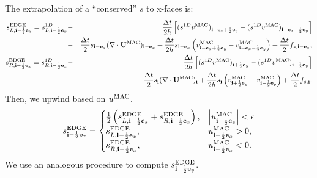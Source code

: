 \documentclass[11pt]{article}
\def\half  {\frac{1}{2}}
\def\dt    {\Delta t}
\def\edge  {\rm EDGE}
\def\mac   {\rm MAC}
\def\eb    {{\bf e}}
\def\ib    {{\bf i}}
\def\Ub    {{\bf U}}
\begin{document}
The extrapolation of a ``conserved'' $s$ to x-faces is:
\begin{eqnarray}
s_{L,\ib-\half\eb_x}^{\edge} = s_{L,\ib-\half\eb_x}^{1D} &-& \frac{\dt}{2h}\left[(s^{1D} v^{\mac})_{\ib-\eb_x+\half\eb_y} - (s^{1D} v^{\mac})_{\ib-\eb_x-\half\eb_y}\right] \nonumber \\
&-& \frac{\dt}{2}s_{\ib-\eb_x}(\nabla\cdot\Ub^{\mac})_{\ib-\eb_x} + \frac{\dt}{2h}s_{\ib-\eb_x}\left(v_{\ib-\eb_x+\half\eb_y}^{\mac} - v_{\ib-\eb_x-\half\eb_y}^{\mac}\right) + \frac{\dt}{2}f_{s,\ib-\eb_x}, \\
s_{R,\ib-\half\eb_x}^{\edge} = s_{R,\ib-\half\eb_x}^{1D} &-& \frac{\dt}{2h}\left[(s^{1D} v^{\mac})_{\ib+\half\eb_y} - (s^{1D} v^{\mac})_{\ib-\half\eb_y}\right] \nonumber \\
&-& \frac{\dt}{2}s_{\ib}(\nabla\cdot\Ub^{\mac})_{\ib} + \frac{\dt}{2h}s_{\ib}\left(v_{\ib+\half\eb_y}^{\mac} - v_{\ib-\half\eb_y}^{\mac}\right) + \frac{\dt}{2}f_{s,\ib}.
\end{eqnarray}
Then, we upwind based on $u^{\mac}$.
\begin{equation}
s_{\ib-\half\eb_x}^{\edge} =
\begin{cases}
\half\left(s_{L,\ib-\half\eb_x}^{\edge} + s_{R,\ib-\half\eb_x}^{\edge}\right), & \left|u^{\mac}_{\ib-\half\eb_x}\right| < \epsilon \\
s_{L,\ib-\half\eb_x}^{\edge}, & u^{\mac}_{\ib-\half\eb_x} > 0, \\
s_{R,\ib-\half\eb_x}^{\edge}, & u^{\mac}_{\ib-\half\eb_x} < 0.
\end{cases}\label{varden s^edge upwind}
\end{equation}
We use an analogous procedure to compute $s_{\ib-\half\eb_y}^{\edge}$.
\end{document}
